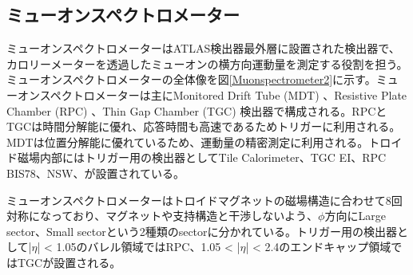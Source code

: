 \subsection{ミューオンスペクトロメーター}
\label{subsec_Muonspectrometer}
ミューオンスペクトロメーターはATLAS検出器最外層に設置された検出器で、カロリーメーターを透過したミューオンの横方向運動量を測定する役割を担う。ミューオンスペクトロメーターの全体像を図\ref{Muonspectrometer2}に示す。ミューオンスペクトロメーターは主にMonitored Drift Tube  (MDT) 、Resistive Plate Chamber  (RPC) 、Thin Gap Chamber  (TGC)  検出器で構成される。RPCとTGCは時間分解能に優れ、応答時間も高速であるためトリガーに利用される。MDTは位置分解能に優れているため、運動量の精密測定に利用される。トロイド磁場内部にはトリガー用の検出器としてTile Calorimeter、TGC EI、RPC BIS78、NSW、が設置されている。

ミューオンスペクトロメーターはトロイドマグネットの磁場構造に合わせて8回対称になっており、マグネットや支持構造と干渉しないよう、$\phi$方向にLarge sector、Small sectorという2種類のsectorに分かれている。トリガー用の検出器として|$\eta$| < 1.05のバレル領域ではRPC、1.05 < |$\eta$| < 2.4のエンドキャップ領域ではTGCが設置される。

